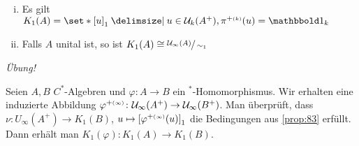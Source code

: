 \begin{bemerkung}
	\begin{enumerate}[(i)]
		\item Es gilt $K_1(A) = \set*{\benbrace*{u}_1 \given u \in \mathcal{U}_k(A^+), \pi^{+\ssbrace{k}}(u) =\ind_k}$
		\item Falls $A$ unital ist, so ist $K_1(A) \cong \sfrac{\mathcal{U}_\infty(A)}{\sim_1}$
	\end{enumerate}
\end{bemerkung}
\begin{beweis}
	\emph{Übung!}
\end{beweis}

Seien $A,B$ $C^*$-Algebren und $\varphi \colon A \to B$ ein $^*$-Homomorphismus.
Wir erhalten eine induzierte Abbildung $\varphi^{+\ssbrace{\infty}} \colon \mathcal{U}_\infty(A^+) \to \mathcal{U}_\infty(B^+)$.
Man überprüft, dass $\nu \colon U_\infty(A^+) \to K_1(B)$, $u \mapsto \benbrace*{\varphi^{+\ssbrace{\infty}}(u)}_1$ die Bedingungen aus \autoref{prop:83} erfüllt.
Dann erhält man $K_1(\varphi) \colon K_1(A) \to K_1(B)$.

